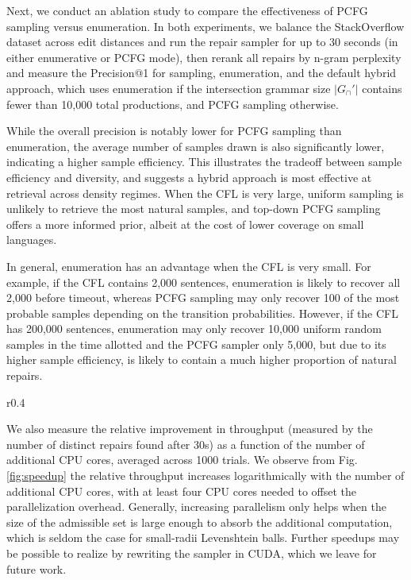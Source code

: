 \documentclass[sigplan,review,acmsmall,nonacm,anonymous]{acmart}\settopmatter{printfolios=false,printccs=false,printacmref=false}
\begin{document}
  Next, we conduct an ablation study to compare the effectiveness of PCFG sampling versus enumeration. In both experiments, we balance the StackOverflow dataset across edit distances and run the repair sampler for up to 30 seconds (in either enumerative or PCFG mode), then rerank all repairs by n-gram perplexity and measure the Precision@1 for sampling, enumeration, and the default hybrid approach, which uses enumeration if the intersection grammar size $|G_\cap'|$ contains fewer than 10,000 total productions, and PCFG sampling otherwise.

  \begin{figure}[h]
    
    
    
  \end{figure}

  While the overall precision is notably lower for PCFG sampling than enumeration, the average number of samples drawn is also significantly lower, indicating a higher sample efficiency. This illustrates the tradeoff between sample efficiency and diversity, and suggests a hybrid approach is most effective at retrieval across density regimes. When the CFL is very large, uniform sampling is unlikely to retrieve the most natural samples, and top-down PCFG sampling offers a more informed prior, albeit at the cost of lower coverage on small languages.

  In general, enumeration has an advantage when the CFL is very small. For example, if the CFL contains 2,000 sentences, enumeration is likely to recover all 2,000 before timeout, whereas PCFG sampling may only recover 100 of the most probable samples depending on the transition probabilities. However, if the CFL has 200,000 sentences, enumeration may only recover 10,000 uniform random samples in the time allotted and the PCFG sampler only 5,000, but due to its higher sample efficiency, is likely to contain a much higher proportion of natural repairs.

  \begin{wrapfigure}{r}{0.4\textwidth}
    
    \caption{Observed improvement in throughput relative to total CPU cores assigned.}
    \label{fig:speedup}
  \end{wrapfigure}

  We also measure the relative improvement in throughput (measured by the number of distinct repairs found after 30s) as a function of the number of additional CPU cores, averaged across 1000 trials. We observe from Fig.\ref{fig:speedup} the relative throughput increases logarithmically with the number of additional CPU cores, with at least four CPU cores needed to offset the parallelization overhead. Generally, increasing parallelism only helps when the size of the admissible set is large enough to absorb the additional computation, which is seldom the case for small-radii Levenshtein balls. Further speedups may be possible to realize by rewriting the sampler in CUDA, which we leave for future work.
\end{document}
